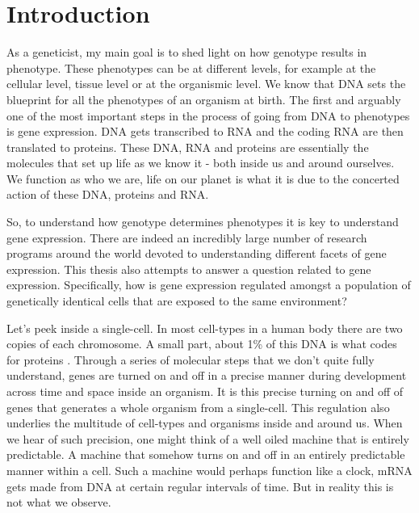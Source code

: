 \chapter{Introduction}
\label{chap:introduction}
\tightlists

As a geneticist, my main goal is to shed light on how genotype results in phenotype. These phenotypes can be at different levels, for example at the cellular level, tissue level or at the organismic level. We know that DNA sets the blueprint for all the phenotypes of an organism at birth. The first and arguably one of the most important steps in the process of going from DNA to phenotypes is gene expression. DNA gets transcribed to RNA and the coding RNA are then translated to proteins. These DNA, RNA and proteins are essentially the molecules that set up life as we know it - both inside us and around ourselves. We function as who we are, life on our planet is what it is due to the concerted action of these DNA, proteins and RNA.

So, to understand how genotype determines phenotypes it is key to understand gene expression. There are indeed an incredibly large number of research programs around the world devoted to understanding different facets of gene expression. This thesis also attempts to answer a question related to gene expression. Specifically, how is gene expression regulated amongst a population of genetically identical cells that are exposed to the same environment?

Let's peek inside a single-cell. In most cell-types in a human body there are two copies of each chromosome. A small part, about 1\% of this DNA is what codes for proteins \cite {lander2001n}. Through a series of molecular steps that we don't quite fully understand, genes are turned on and off in a precise manner during development across time and space inside an organism. It is this precise turning on and off of genes that generates a whole organism from a single-cell. This regulation also underlies the multitude of cell-types and organisms inside and around us. When we hear of such precision, one might think of a well oiled machine that is entirely predictable. A machine that somehow turns on and off in an entirely predictable manner within a cell. Such a machine would perhaps function like a clock, mRNA gets made from DNA at certain regular intervals of time. But in reality this is not what we observe.


